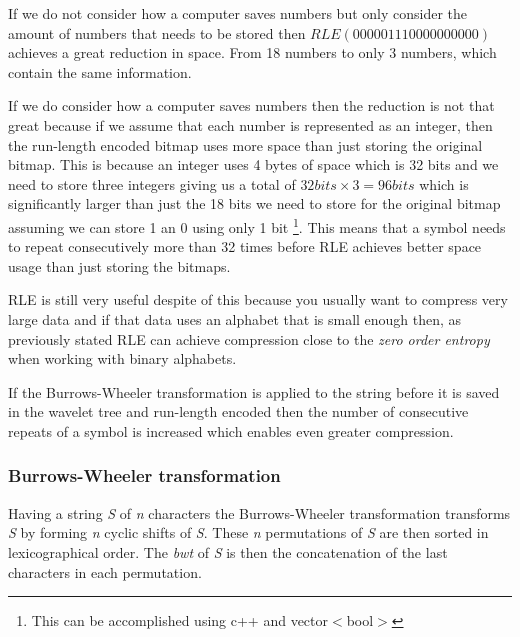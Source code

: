 If we do not consider how a computer saves numbers but only consider the amount of numbers that needs to be stored then $RLE(000001110000000000)$ achieves a great reduction in space.
From 18 numbers to only 3 numbers, which contain the same information.

If we do consider how a computer saves numbers then the reduction is not that great because if we assume that each number is represented as an integer, then the run-length encoded bitmap uses more space than just storing the original bitmap. 
This is because an integer uses 4 bytes of space which is 32 bits and we need to store three integers giving us a total of $32 bits \times 3 = 96 bits$ which is significantly larger than just the 18 bits we need to store for the original bitmap assuming we can store 1 an 0 using only 1 bit \footnote{This can be accomplished using c++ and vector$<$bool$>$}. 
This means that a symbol needs to repeat consecutively more than 32 times before RLE achieves better space usage than just storing the bitmaps.

RLE is still very useful despite of this because you usually want to compress very large data and if that data uses an alphabet that is small enough then, as previously stated RLE can achieve compression close to the \textit{zero order entropy} when working with binary alphabets.

If the Burrows-Wheeler transformation is applied to the string before it is saved in the wavelet tree and run-length encoded then the number of consecutive repeats of a symbol is increased which enables even greater compression.

\subsubsection{Burrows-Wheeler transformation}
Having a string \textit{S} of \textit{n} characters the Burrows-Wheeler transformation \citep{BWToriginalArticle} transforms \textit{S} by forming \textit{n} cyclic shifts of \textit{S}. 
These \textit{n} permutations of \textit{S} are then sorted in lexicographical order.
The \textit{bwt} of \textit{S} is then the concatenation of the last characters in each permutation.

